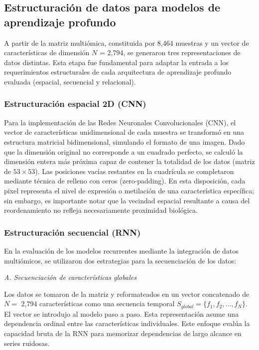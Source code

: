 \documentclass[review,12pt,times,number]{elsarticle}
\begin{document}
\subsection{Estructuración de datos para modelos de aprendizaje profundo}

A partir de la matriz multiómica, constituida por 8,464 muestras y un vector de características de dimensión $N$ = 2,794, se generaron tres representaciones de datos distintas. Esta etapa fue fundamental para adaptar la entrada a los requerimientos estructurales de cada arquitectura de aprendizaje profundo evaluada (espacial, secuencial y relacional).

\subsubsection{Estructuración espacial 2D (CNN)}

Para la implementación de las Redes Neuronales Convolucionales (CNN), el vector de características unidimensional de cada muestra se transformó en una estructura matricial bidimensional, simulando el formato de una imagen. Dado que la dimensión original no corresponde a un cuadrado perfecto, se calculó la dimensión entera más próxima capaz de contener la totalidad de los datos (matriz de $53 \times 53$). Las posiciones vacías restantes en la cuadrícula se completaron mediante técnica de relleno con ceros (zero-padding). En esta disposición, cada pixel representa el nivel de expresión o metilación de una característica específica; sin embargo, es importante notar que la vecindad espacial resultante a causa del reordenamiento no refleja necesariamente proximidad biológica.


\subsubsection{Estructuración secuencial (RNN)}

En la evaluación de los modelos recurrentes mediante la integración de datos multiómicos, se utilizaron dos estrategias para la secuenciación de los datos:

\textit{A. Secuenciación de características globales}

Los datos se tomaron de la matriz y reformateados en un vector concatenado de $N =$ 2,794 características como una secuencia temporal $S_{global} = \{f_1, f_2, ..., f_N\}$. El vector se introdujo al modelo paso a paso. Esta representación asume una dependencia ordinal entre las características individuales. Este enfoque evalúa la capacidad bruta de la RNN para memorizar dependencias de largo alcance en series ruidosas.
\end{document}
